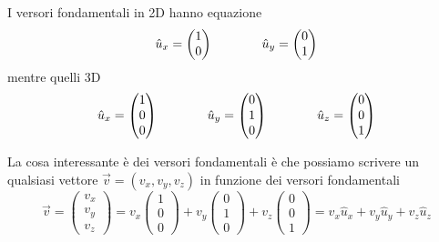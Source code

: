 \documentclass{rapport}
\begin{document}
\begin{figure}[htbp]
    
\end{figure}

I versori fondamentali in 2D hanno equazione 
\[
\begin{array}{c@{\qquad}@{\qquad}c}
  \hat{u}_x = \begin{pmatrix}
  1 \\
  0
\end{pmatrix} & 
\hat{u}_y = \begin{pmatrix}
  0 \\
  1
\end{pmatrix}
\end{array}
\]
mentre quelli 3D 
\[
\begin{array}{c@{\qquad}@{\qquad}c@{\qquad}@{\qquad}c}
  \hat{u}_x = \begin{pmatrix}
  1 \\
  0 \\
  0
\end{pmatrix} & 
\hat{u}_y = \begin{pmatrix}
  0 \\
  1\\
  0
\end{pmatrix}& 
\hat{u}_z = \begin{pmatrix}
  0 \\
  0\\
  1
\end{pmatrix}
\end{array}
\]

La cosa interessante è dei versori fondamentali è che possiamo scrivere un qualsiasi vettore $\vec{v}=(v_x, v_y, v_z)$ in funzione dei versori fondamentali
\[
\vec{v}=\begin{pmatrix}
v_x \\ v_y\\ v_z 
\end{pmatrix} = v_x
\begin{pmatrix}
1 \\ 0\\ 0
\end{pmatrix} +v_y\begin{pmatrix}
0 \\ 1\\0 
\end{pmatrix} +v_z \begin{pmatrix}
0\\ 0\\ 1
\end{pmatrix} = v_x \hat{u}_x + v_y \hat{u}_y+ v_z \hat{u}_z 
\]
\end{document}
